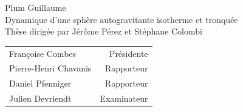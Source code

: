 \begin{titlepage}
	\vspace{3cm}
	\begin{center}
		\Large Plum Guillaume \\
		\vspace{6cm}
		\Huge Dynamique d'une sphère autogravitante isotherme et tronquée \\
		\vspace{3cm}
		\vspace{3cm}
		\normalsize Thèse dirigée par Jérôme Pérez et Stéphane Colombi \\
	\end{center}
	\vspace{2cm}
	\begin{tabular}{lr}
		Françoise Combes & Présidente \\
		Pierre-Henri Chavanis & Rapporteur \\
		Daniel Pfenniger & Rapporteur \\
		Julien Devriendt & Examinateur
	\end{tabular}
	\thispagestyle{empty}
\end{titlepage}
